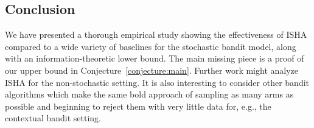 \subsection{Conclusion}
We have presented a thorough empirical study showing the effectiveness
of ISHA compared to a wide variety of baselines for the
stochastic bandit model, along with an information-theoretic lower bound.
The main missing piece is a proof of our upper bound in Conjecture~\ref{conjecture:main}.
Further work might analyze ISHA for the non-stochastic setting.
It is also interesting to consider other bandit algorithms which make
the same bold approach of sampling as many arms as possible and beginning
to reject them with very little data for, e.g., the contextual bandit
setting.

